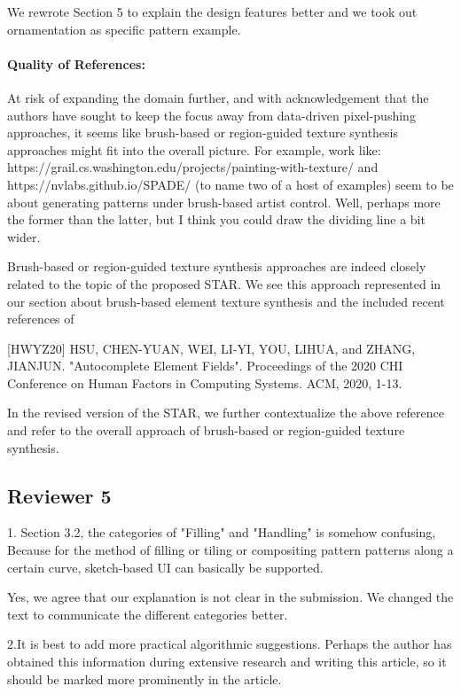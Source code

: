 \documentclass{egpubl}
\newcommand{\rev}[2]{{\color{greenrev}\textsuperscript{#1}#2}}
\renewcommand{\rev}[2]{{#2}}
\begin{document}
\rev{Comment}{We rewrote Section 5 to explain the design features better and we took out ornamentation as specific pattern example.}


\paragraph*{Quality of References:} At risk of expanding the domain further, and with acknowledgement that the authors have sought to keep the focus away from data-driven pixel-pushing approaches,  it seems like brush-based or region-guided texture synthesis approaches might fit into the overall picture. For example, work like:
https://grail.cs.washington.edu/projects/painting-with-texture/
and https://nvlabs.github.io/SPADE/
(to name two of a host of examples)
seem to be about generating patterns under brush-based artist control. Well, perhaps more the former than the latter, but I think you could draw the dividing line a bit wider.

\rev{Comment}{
    Brush-based or region-guided texture synthesis approaches are indeed closely related to the topic of the proposed STAR. We see this approach represented in our section about brush-based element texture synthesis and the included recent references of 

    [HWYZ20]  HSU, CHEN-YUAN, WEI, LI-YI, YOU, LIHUA, and ZHANG, JIANJUN. "Autocomplete Element Fields". Proceedings of the 2020 CHI Conference on Human Factors in Computing Systems. ACM, 2020, 1-13.

    In the revised version of the STAR, we further contextualize the above reference and refer to the overall approach of brush-based or region-guided texture synthesis.
}


\subsection*{Reviewer 5} 

1. Section 3.2, the categories of "Filling" and "Handling" is somehow confusing, Because for the method of filling or tiling or compositing pattern patterns along a certain curve, sketch-based UI can basically be supported.

\rev{Comment}{Yes, we agree that our explanation is not clear in the submission. We changed the text to communicate the different categories better.}

2.It is best to add more practical algorithmic suggestions. Perhaps the author has obtained this information during extensive research and writing this article, so it should be marked more prominently in the article.
\end{document}
